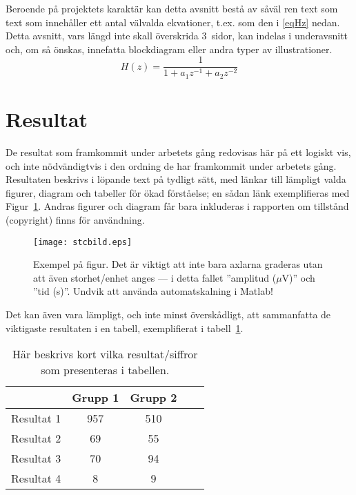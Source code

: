 \documentclass[twoside,twocolumn,9pt,a4paper]{IEEEtran}
\begin{document}
Beroende på projektets karaktär kan detta avsnitt bestå av såväl ren text som text som innehåller ett antal välvalda ekvationer, t.ex. som den i \eqref{eqHz} nedan. Detta avsnitt, vars längd inte skall överskrida 3~sidor, kan indelas i underavsnitt och, om så önskas, innefatta blockdiagram eller andra typer av illustrationer.
\begin{equation}
H(z) = \frac{1}{1+a_1z^{-1}+a_2z^{-2}}
\label{eqHz}
\end{equation}



\section{Resultat}
De resultat som framkommit under arbetets gång redovisas här på ett logiskt vis, och inte nödvändigtvis i den ordning de har framkommit under arbetets gång. Resultaten beskrivs i löpande text på tydligt sätt, med länkar till lämpligt valda figurer, diagram och tabeller för ökad förståelse; en sådan länk exemplifieras med Figur~\ref{figExempelSignal}. Andras figurer och diagram får bara inkluderas i rapporten om tillstånd (copyright) finns för användning.

\begin{figure}[h]
\begin{center}
\texttt{[image: stcbild.eps]} %
\caption{Exempel på figur. Det är viktigt att inte bara axlarna graderas utan att även storhet/enhet anges --- i detta fallet ''amplitud ($\mu$V)'' och ''tid (s)''. Undvik att använda automatskalning i Matlab!}
\label{figExempelSignal}
\end{center}
\end{figure}

Det kan även vara lämpligt, och inte minst överskådligt, att sammanfatta de viktigaste resultaten i en tabell, exemplifierat i tabell~\ref{tableData}. 

\begin{table}[h]
\begin{center}
\caption{Här beskrivs kort vilka resultat/siffror som presenteras i tabellen.}
\renewcommand\arraystretch{1.25}
\begin{tabular}{|l|c|c|c|c|} \hline
 & Grupp 1 & Grupp 2 \\ \hline\hline
Resultat 1 &957  & 510 \\ \hline
Resultat 2 & 69 & 55  \\ \hline
Resultat 3 & 70 & 94 \\ \hline
Resultat 4  & 8 & 9 \\ \hline
\end{tabular}
\label{tableData}
\end{center}
\end{table}
\end{document}
